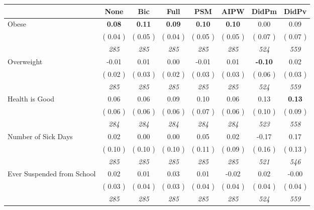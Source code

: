 \begin{tabular}{l c c c c c c c}
\toprule
 & None & Bic & Full & PSM & AIPW & DidPm & DidPv \\
\midrule
Obese & \textbf{      0.08 } & \textbf{      0.11 } & \textbf{      0.09 } & \textbf{     0.10} & \textbf{     0.10} &      0.00 &      0.09 \\
& (     0.04 ) & (     0.05 ) & (     0.04 ) & (     0.05 ) & (     0.05 ) & (     0.07 ) & (     0.07 ) \\
& \textit{ 285 } & \textit{ 285 } & \textit{ 285 } & \textit{ 285 } & \textit{ 285 } & \textit{ 524 } & \textit{ 559 } \\
Overweight &     -0.01 &      0.01 &      0.00 &     -0.01 &      0.01 & \textbf{     -0.10 } &      0.02 \\
& (     0.02 ) & (     0.03 ) & (     0.02 ) & (     0.03 ) & (     0.03 ) & (     0.06 ) & (     0.03 ) \\
& \textit{ 285 } & \textit{ 285 } & \textit{ 285 } & \textit{ 285 } & \textit{ 285 } & \textit{ 524 } & \textit{ 559 } \\
Health is Good &      0.06 &      0.06 &      0.09 &      0.10 &      0.06 &      0.13 & \textbf{      0.13 } \\
& (     0.06 ) & (     0.06 ) & (     0.06 ) & (     0.07 ) & (     0.06 ) & (     0.10 ) & (     0.09 ) \\
& \textit{ 284 } & \textit{ 284 } & \textit{ 284 } & \textit{ 284 } & \textit{ 284 } & \textit{ 523 } & \textit{ 558 } \\
Number of Sick Days &      0.02 &      0.00 &      0.00 &      0.05 &      0.02 &     -0.17 &      0.17 \\
& (     0.10 ) & (     0.10 ) & (     0.10 ) & (     0.11 ) & (     0.09 ) & (     0.16 ) & (     0.13 ) \\
& \textit{ 285 } & \textit{ 285 } & \textit{ 285 } & \textit{ 285 } & \textit{ 285 } & \textit{ 521 } & \textit{ 546 } \\
Ever Suspended from School &      0.02 &      0.01 &      0.03 &      0.01 &     -0.02 &      0.02 &     -0.00 \\
& (     0.03 ) & (     0.04 ) & (     0.03 ) & (     0.04 ) & (     0.04 ) & (     0.04 ) & (     0.04 ) \\
& \textit{ 285 } & \textit{ 285 } & \textit{ 285 } & \textit{ 285 } & \textit{ 285 } & \textit{ 524 } & \textit{ 559 } \\
\bottomrule
\end{tabular}
